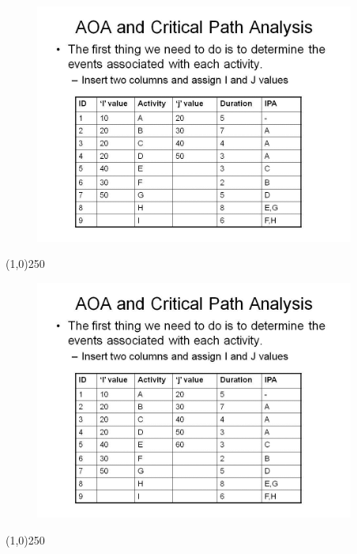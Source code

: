 \begin{frame}
\begin{figure}
	\centering
		\includegraphics[width = 10.5cm]{oldnotes/Slide70.jpg}
\end{figure}
\end{frame}
\begin{center}\line(1,0){250}\end{center}


\begin{frame}
\begin{figure}
	\centering
		\includegraphics[width = 10.5cm]{oldnotes/Slide71.jpg}
\end{figure}
\end{frame}
\begin{center}\line(1,0){250}\end{center}


